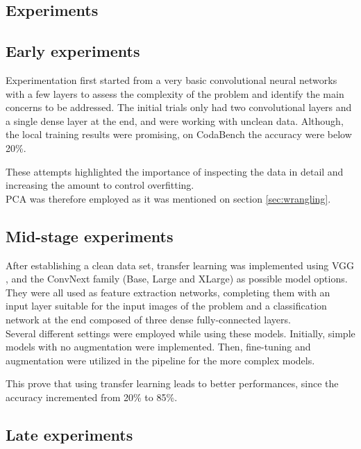 \documentclass[11pt]{article}
\begin{document}
\begin{multicols}{2}
    \section{Experiments}
        \subsection{Early experiments}
		Experimentation first started from a very basic convolutional neural networks with a few layers to assess the complexity of the problem and identify the main concerns to be addressed. The initial trials only had two convolutional layers and a single dense layer at the end, and were working with unclean data. 
        Although, the local training results were promising, on CodaBench the accuracy were below 20\%.
        
        These attempts highlighted the importance of inspecting the data in detail and increasing the amount to control overfitting. \\  
        PCA was therefore employed as it was mentioned on section \ref{sec:wrangling}.

        \subsection{Mid-stage experiments}

        After establishing a clean data set, transfer learning was implemented using VGG \cite{simonyan2014very}, and the ConvNext family (Base, Large and XLarge) \cite{liu2022convnet} as possible model options. 
        They were all used as feature extraction networks, completing them with an input layer suitable for the input images of the problem and a classification network at the end composed of three dense fully-connected layers. \\
        Several different settings were employed while using these models. Initially, simple models with no augmentation were implemented. Then, fine-tuning and augmentation were utilized in the pipeline for the more complex models. 

        This prove that using transfer learning leads to better performances, since the accuracy incremented from 20\% to 85\%.
        
        \subsection{Late experiments}


\end{multicols}
\end{document}
